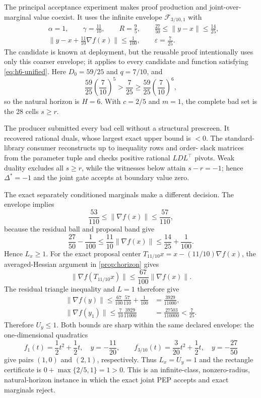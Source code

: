 \documentclass[smallextended]{svjour3}
\newcommand{\cF}{\mathcal{F}}
\newcommand{\norm}[1]{\lVert #1\rVert}
\newcommand{\eps}{\varepsilon}
\begin{document}
The principal acceptance experiment makes proof production and
joint-over-marginal value coexist.  It uses the infinite envelope
$\cF_{3/10,1}$ with
\begin{equation}
 \begin{aligned}
  &\alpha=1,\qquad \gamma=\frac{11}{10},\qquad R=\frac95,
  \qquad \frac{27}{50}\leq\norm{y-x}\leq\frac{14}{25},\\
  &\norm{y-x+\tfrac{11}{10}\nabla f(x)}\leq\frac1{100},
  \qquad \eps=\frac7{25}.
 \end{aligned}                                      \label{eq:h6-unified}
\end{equation}
The candidate is known at deployment, but the reusable proof intentionally
uses only this coarser envelope; it applies to every candidate and function
satisfying \eqref{eq:h6-unified}.  Here $D_0=59/25$ and $q=7/10$, and
\[
 \frac{59}{25}\left(\frac7{10}\right)^5>\frac7{25}
 \geq\frac{59}{25}\left(\frac7{10}\right)^6,
\]
so the natural horizon is $H=6$.  With $c=2/5$ and $m=1$, the complete bad set
is the 28 cells $s\geq r$.

The producer submitted every bad cell without a structural prescreen.  It
recovered \HsixJointCertificates{} rational duals, whose largest exact upper
bound is \HsixJointUpper{}$<0$.  The standard-library consumer reconstructs up to
\HsixJointInequalities{} inequality rows and order-\HsixJointGram{} slack
matrices from the parameter tuple and checks \HsixJointPivots{} positive
rational $LDL^\top$ pivots.  Weak duality excludes all $s\geq r$, while the
witnesses below attain $s-r=-1$; hence $\Delta^*=-1$ and the joint gate accepts
at boundary value zero.

The exact separately conditioned marginals make a different decision.  The envelope
implies
\[
 \frac{53}{110}\leq\norm{\nabla f(x)}\leq\frac{57}{110},
\]
because the residual ball and proposal band give
\[
 \frac{27}{50}-\frac1{100}
 \leq\frac{11}{10}\norm{\nabla f(x)}
 \leq\frac{14}{25}+\frac1{100}.
\]
Hence $L_x\geq1$.  For the exact proposal center
$T_{11/10}x=x-(11/10)\nabla f(x)$, the averaged-Hessian argument in
\cref{prop:horizon} gives
\[
 \norm{\nabla f(T_{11/10}x)}
 \leq\frac{67}{100}\norm{\nabla f(x)}.
\]
The residual triangle inequality and $L=1$ therefore give
\begin{align*}
 \norm{\nabla f(y)}
 \leq\frac{67}{100}\frac{57}{110}+\frac1{100}
 &=\frac{3929}{11000},\\
 \norm{\nabla f(y_1)}\leq\frac7{10}\frac{3929}{11000}
 &=\frac{27503}{110000}<\frac7{25}.
\end{align*}
Therefore $U_y\leq1$.  Both bounds are sharp within the same declared
envelope: the one-dimensional quadratics
\[
 f_1(t)=\frac12t^2+\frac12t,\quad y=-\frac{11}{20},
 \qquad
 f_{3/10}(t)=\frac3{20}t^2+\frac12t,\quad y=-\frac{27}{50}
\]
give pairs $(1,0)$ and $(2,1)$, respectively.  Thus $L_x=U_y=1$ and the
rectangle certificate is $0+\max\{2/5,1\}=1>0$.  This is an infinite-class,
nonzero-radius, natural-horizon instance in which the exact joint PEP accepts
and exact marginals reject.
\end{document}
